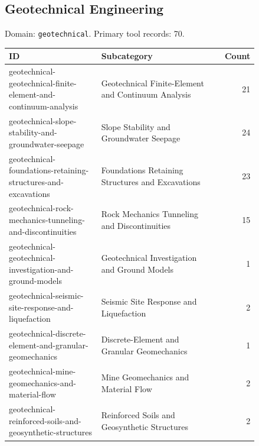 \subsection{Geotechnical Engineering}
\noindent Domain: \texttt{geotechnical}. Primary tool records: 70.
\begin{longtable}{p{0.37\linewidth}p{0.47\linewidth}r}
ID & Subcategory & Count\\\hline\endhead
geotechnical-geotechnical-finite-element-and-continuum-analysis & Geotechnical Finite-Element and Continuum Analysis & 21\\
geotechnical-slope-stability-and-groundwater-seepage & Slope Stability and Groundwater Seepage & 24\\
geotechnical-foundations-retaining-structures-and-excavations & Foundations Retaining Structures and Excavations & 23\\
geotechnical-rock-mechanics-tunneling-and-discontinuities & Rock Mechanics Tunneling and Discontinuities & 15\\
geotechnical-geotechnical-investigation-and-ground-models & Geotechnical Investigation and Ground Models & 1\\
geotechnical-seismic-site-response-and-liquefaction & Seismic Site Response and Liquefaction & 2\\
geotechnical-discrete-element-and-granular-geomechanics & Discrete-Element and Granular Geomechanics & 1\\
geotechnical-mine-geomechanics-and-material-flow & Mine Geomechanics and Material Flow & 2\\
geotechnical-reinforced-soils-and-geosynthetic-structures & Reinforced Soils and Geosynthetic Structures & 2\\
\end{longtable}
